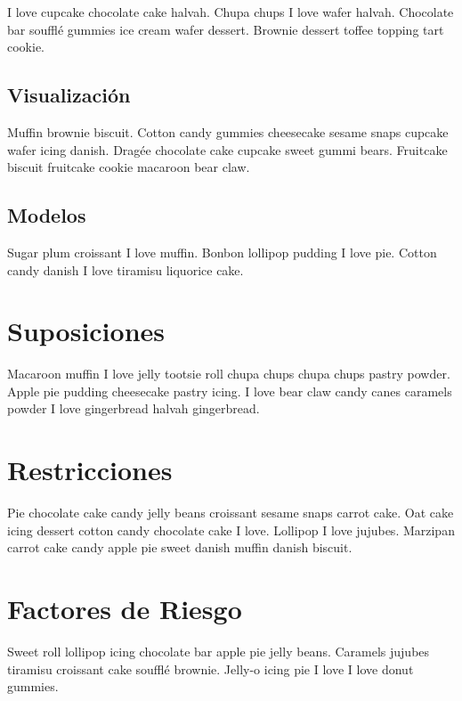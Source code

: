 I love cupcake chocolate cake halvah. Chupa chups I love wafer halvah. Chocolate bar soufflé gummies ice cream wafer dessert. Brownie dessert toffee topping tart cookie.

\subsection{Visualización}
\label{subsection:retos:viz}

Muffin brownie biscuit. Cotton candy gummies cheesecake sesame snaps cupcake wafer icing danish. Dragée chocolate cake cupcake sweet gummi bears. Fruitcake biscuit fruitcake cookie macaroon bear claw.

\subsection{Modelos}
\label{subsection:retos:modelos}

Sugar plum croissant I love muffin. Bonbon lollipop pudding I love pie. Cotton candy danish I love tiramisu liquorice cake.

\section{Suposiciones}
\label{section:suposiciones}

Macaroon muffin I love jelly tootsie roll chupa chups chupa chups pastry powder. Apple pie pudding cheesecake pastry icing. I love bear claw candy canes caramels powder I love gingerbread halvah gingerbread.

\section{Restricciones}
\label{section:restricciones}

Pie chocolate cake candy jelly beans croissant sesame snaps carrot cake. Oat cake icing dessert cotton candy chocolate cake I love. Lollipop I love jujubes. Marzipan carrot cake candy apple pie sweet danish muffin danish biscuit.

\section{Factores de Riesgo}
\label{section:riesgos}

Sweet roll lollipop icing chocolate bar apple pie jelly beans. Caramels jujubes tiramisu croissant cake soufflé brownie. Jelly-o icing pie I love I love donut gummies.

